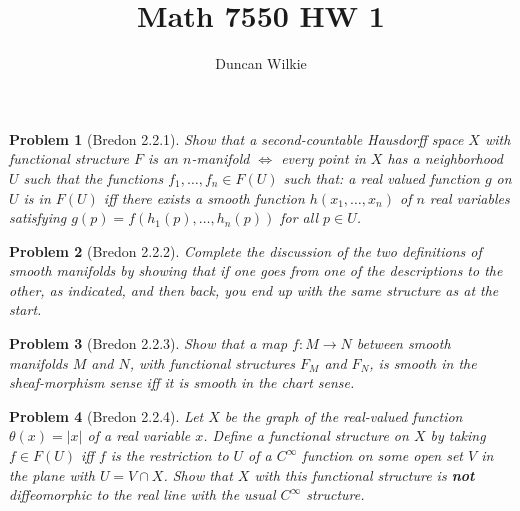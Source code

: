 \documentclass{article}
\title{Math 7550 HW 1}
\author{Duncan Wilkie}
\date{}
\newtheorem{plm}{Problem}
\begin{document}
\maketitle

\begin{plm}[Bredon 2.2.1]
  Show that a second-countable Hausdorff space $X$ with functional structure $F$ is an $n$-manifold
  $\Leftrightarrow$ every point in $X$ has a neighborhood $U$ such that the functions $f_{1}, \ldots, f_{n} \in F(U)$
  such that: a real valued function $g$ on $U$ is in $F(U)$ iff there exists a smooth function $h(x_{1}, \ldots, x_{n})$
  of $n$ real variables satisfying $g(p) = f(h_{1}(p), \ldots, h_{n}(p))$ for all $p \in U$.
\end{plm}

\begin{plm}[Bredon 2.2.2]
  Complete the discussion of the two definitions of smooth manifolds by showing that if one goes from one of the descriptions to the other,
  as indicated, and then back, you end up with the same structure as at the start.
\end{plm}

\begin{plm}[Bredon 2.2.3]
  Show that a map $f: M \to N$ between smooth manifolds $M$ and $N$, with functional structures $F_{M}$ and $F_{N}$,
  is smooth in the sheaf-morphism sense iff it is smooth in the chart sense.
\end{plm}

\begin{plm}[Bredon 2.2.4]
  Let $X$ be the graph of the real-valued function $\theta(x) = |x|$ of a real variable $x$.
  Define a functional structure on $X$ by taking $f \in F(U)$ iff $f$ is the restriction to $U$ of a $C^{\infty}$ function
  on some open set $V$ in the plane with $U = V \cap X$.
  Show that $X$ with this functional structure is \textbf{not} diffeomorphic to the real line with the usual $C^{\infty}$ structure.
\end{plm}
\end{document}
